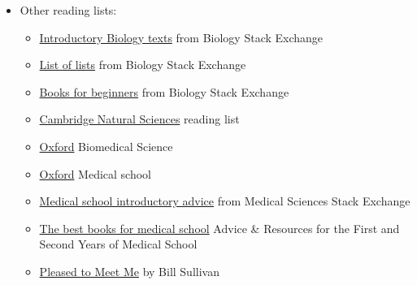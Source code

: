 \documentclass{article}
\begin{document}
\begin{itemize}
    \item Other reading lists:
    \begin{itemize}
        \item \href{https://biology.stackexchange.com/questions/10376/introductory-biology-text-for-an-outsider}{Introductory Biology texts} from Biology Stack Exchange
        \item \href{https://biology.stackexchange.com/questions/35152/choosing-a-book-to-gain-general-knowledge-about-biology}{List of lists} from Biology Stack Exchange
        \item \href{https://biology.stackexchange.com/questions/21475/books-for-beginners}{Books for beginners} from Biology Stack Exchange
        \item \href{https://www.natsci.tripos.cam.ac.uk/prospective-students/reading}{Cambridge Natural Sciences} reading list
        \item \href{http://www.ox.ac.uk/sites/files/oxford/media_wysiwyg/Introductory_Reading_for_Biomedical_Sciences1.pdf}{Oxford} Biomedical Science
        \item \href{https://www.medsci.ox.ac.uk/study/medicine/pre-clinical/applying/reading}{Oxford} Medical school
        \item \href{https://medicalsciences.stackexchange.com/questions/19310/how-does-one-determine-which-textbook-to-start-with-when-wanting-to-build-knowle/19314}{Medical school introductory advice} from Medical Sciences Stack Exchange 
        \item \href{https://www.medschooladvice.com/best-advice-and-books-for-ms1-ms2-year-classes-and-shelf-exams}{The best books for medical school} Advice \& Resources for the First and Second Years of Medical School
        \item \href{https://www.goodreads.com/book/show/49645285-pleased-to-meet-me}{Pleased to Meet Me} by Bill Sullivan
    \end{itemize}
    

\end{itemize}
\end{document}
